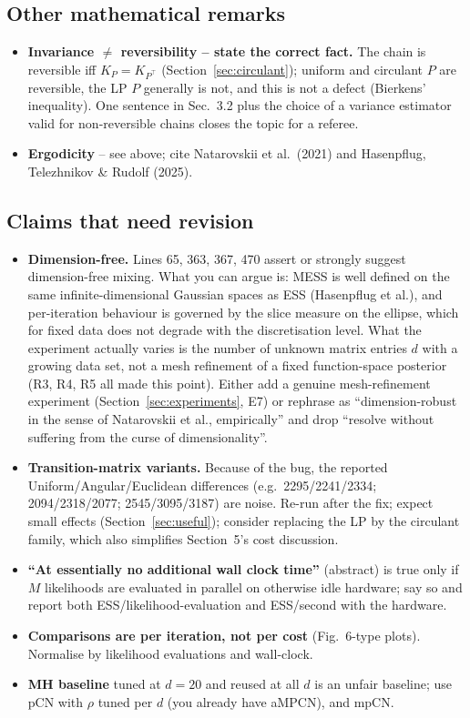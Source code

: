 \documentclass[11pt,a4paper]{article}
\theoremstyle{remark}
\begin{document}
\subsection{Other mathematical remarks}
\begin{itemize}[leftmargin=*]
\item \textbf{Invariance $\neq$ reversibility -- state the correct fact.} The chain is reversible iff $K_P=K_{P^\top}$ (Section~\ref{sec:circulant}); uniform and circulant $P$ are reversible, the LP $P$ generally is not, and this is not a defect (Bierkens' inequality). One sentence in Sec.~3.2 plus the choice of a variance estimator valid for non-reversible chains closes the topic for a referee.
\item \textbf{Ergodicity} -- see above; cite Natarovskii et al.\ (2021) and Hasenpflug, Telezhnikov \& Rudolf (2025).
\end{itemize}

\subsection{Claims that need revision}
\begin{itemize}[leftmargin=*]
\item \textbf{Dimension-free.} Lines 65, 363, 367, 470 assert or strongly suggest dimension-free mixing. What you can argue is: MESS is well defined on the same infinite-dimensional Gaussian spaces as ESS (Hasenpflug et al.), and per-iteration behaviour is governed by the slice measure on the ellipse, which for fixed data does not degrade with the discretisation level. What the experiment actually varies is the number of unknown matrix entries $d$ with a growing data set, not a mesh refinement of a fixed function-space posterior (R3, R4, R5 all made this point). Either add a genuine mesh-refinement experiment (Section~\ref{sec:experiments}, E7) or rephrase as ``dimension-robust in the sense of Natarovskii et al., empirically'' and drop ``resolve without suffering from the curse of dimensionality''.
\item \textbf{Transition-matrix variants.} Because of the bug, the reported Uniform/Angular/Euclidean differences (e.g.\ 2295/2241/2334; 2094/2318/2077; 2545/3095/3187) are noise. Re-run after the fix; expect small effects (Section~\ref{sec:useful}); consider replacing the LP by the circulant family, which also simplifies Section~5's cost discussion.
\item \textbf{``At essentially no additional wall clock time''} (abstract) is true only if $M$ likelihoods are evaluated in parallel on otherwise idle hardware; say so and report both ESS/likelihood-evaluation and ESS/second with the hardware.
\item \textbf{Comparisons are per iteration, not per cost} (Fig.~6-type plots). Normalise by likelihood evaluations and wall-clock.
\item \textbf{MH baseline} tuned at $d=20$ and reused at all $d$ is an unfair baseline; use pCN with $\rho$ tuned per $d$ (you already have aMPCN), and mpCN.
\end{itemize}
\end{document}

